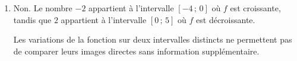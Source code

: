 \begin{methode}
\begin{correction}
\begin{enumerate}
		           Comme $1 < 4$, la fonction $f$ renverse l'ordre, d'où $f(1) > f(4)$.
		    \item Non. Le nombre $-2$ appartient à l'intervalle $[-4 \,;\, 0]$ où $f$ est croissante, tandis que $2$ appartient à l'intervalle $[0 \,;\, 5]$ où $f$ est décroissante.

				Les variations de la fonction sur deux intervalles distincts ne permettent pas de comparer leurs images directes sans information supplémentaire.
		\end{enumerate}
	\end{correction}
\end{methode}
